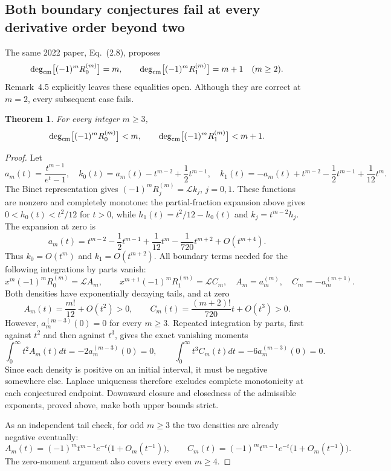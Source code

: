 \documentclass[11pt,a4paper]{article}
\newtheorem{theorem}{Theorem}[section]
\theoremstyle{definition}
\theoremstyle{remark}
\numberwithin{equation}{section}
\begin{document}
\subsection{Both boundary conjectures fail at every derivative order beyond two}
The same 2022 paper, Eq.~(2.8), proposes
\[
 \deg_{\rm cm}\bigl[(-1)^mR_0^{(m)}\bigr]=m,
 \qquad
 \deg_{\rm cm}\bigl[(-1)^mR_1^{(m)}\bigr]=m+1
 \quad(m\geq2).
\]
Remark~4.5 explicitly leaves these equalities open. Although they are
correct at $m=2$, every subsequent case fails.

\begin{theorem}\label{p8:frontier:boundary}
For every integer $m\geq3$,
\[
 \deg_{\rm cm}\bigl[(-1)^mR_0^{(m)}\bigr]<m,
 \qquad
 \deg_{\rm cm}\bigl[(-1)^mR_1^{(m)}\bigr]<m+1.
\]
\end{theorem}
\begin{proof}
Let
\[
 a_m(t)=\frac{t^{m-1}}{e^t-1},\quad
 k_0(t)=a_m(t)-t^{m-2}+\frac12t^{m-1},\quad
 k_1(t)=-a_m(t)+t^{m-2}-\frac12t^{m-1}+\frac1{12}t^m.
\]
The Binet representation gives
$(-1)^mR_j^{(m)}=\mathcal Lk_j$, $j=0,1$. These functions are nonzero
and completely monotone: the partial-fraction expansion above gives
$0<h_0(t)<t^2/12$ for $t>0$, while $h_1(t)=t^2/12-h_0(t)$ and
$k_j=t^{m-2}h_j$. The expansion at zero is
\[
 a_m(t)=t^{m-2}-\frac12t^{m-1}+\frac1{12}t^m
                 -\frac1{720}t^{m+2}+O(t^{m+4}).
\]
Thus $k_0=O(t^m)$ and $k_1=O(t^{m+2})$. All boundary terms needed
for the following integrations by parts vanish:
\[
 x^m(-1)^mR_0^{(m)}=\mathcal L A_m,\qquad
 x^{m+1}(-1)^mR_1^{(m)}=\mathcal L C_m,
 \quad A_m=a_m^{(m)},\quad C_m=-a_m^{(m+1)}.
\]
Both densities have exponentially decaying tails, and at zero
\[
 A_m(t)=\frac{m!}{12}+O(t^2)>0,\qquad
 C_m(t)=\frac{(m+2)!}{720}t+O(t^3)>0.
\]
However, $a_m^{(m-3)}(0)=0$ for every $m\geq3$. Repeated integration
by parts, first against $t^2$ and then against $t^3$, gives the exact
vanishing moments
\[
 \int_0^\infty t^2 A_m(t)dt=-2a_m^{(m-3)}(0)=0,
 \qquad
 \int_0^\infty t^3 C_m(t)dt=-6a_m^{(m-3)}(0)=0.
\]
Since each density is positive on an initial interval, it must be
negative somewhere else. Laplace uniqueness therefore excludes complete
monotonicity at each conjectured endpoint. Downward closure and
closedness of the admissible exponents, proved above, make both upper
bounds strict.

As an independent tail check, for odd $m\geq3$ the two densities are
already negative eventually:
\[
 A_m(t)=(-1)^m t^{m-1}e^{-t}\bigl(1+O_m(t^{-1})\bigr),\qquad
 C_m(t)=(-1)^m t^{m-1}e^{-t}\bigl(1+O_m(t^{-1})\bigr).
\]
The zero-moment argument also covers every even $m\geq4$.
\end{proof}
\end{document}
